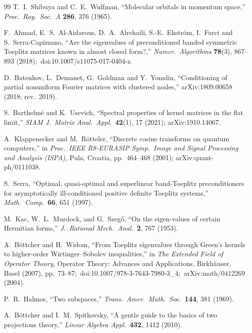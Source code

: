 \documentclass[aps,pra,twocolumn,superscriptaddress,longbibliography]{revtex4-2}
\begin{document}
\begin{thebibliography}{99}
T.~I.~Shibuya and C.~E.~Wulfman, ``Molecular orbitals in momentum space,''
\textit{Proc.\ Roy.\ Soc.\ A} \textbf{286}, 376 (1965).

F.~Ahmad, E.~S.~Al-Aidarous, D.~A.~Alrehaili, S.-E.~Ekstr\"om, I.~Furci and
S.~Serra-Capizzano, ``Are the eigenvalues of preconditioned banded symmetric
Toeplitz matrices known in almost closed form?,'' \textit{Numer.\ Algorithms}
\textbf{78}(3), 867--893 (2018);\ doi:10.1007/s11075-017-0404-z.

D.~Batenkov, L.~Demanet, G.~Goldman and Y.~Yomdin, ``Conditioning of partial
nonuniform Fourier matrices with clustered nodes,'' arXiv:1809.00658 (2018;
rev.\ 2019).

S.~Barthelm\'e and K.~Usevich, ``Spectral properties of kernel matrices in the
flat limit,'' \textit{SIAM J.\ Matrix Anal.\ Appl.}\ \textbf{42}(1), 17 (2021);
arXiv:1910.14067.

A.~Klappenecker and M.~R\"otteler, ``Discrete cosine transforms on quantum
computers,'' in \textit{Proc.\ IEEE R8-EURASIP Symp.\ Image and Signal
Processing and Analysis (ISPA)}, Pula, Croatia, pp.\ 464--468 (2001);
arXiv:quant-ph/0111038.

S.~Serra, ``Optimal, quasi-optimal and superlinear band-Toeplitz
preconditioners for asymptotically ill-conditioned positive definite Toeplitz
systems,'' \textit{Math.\ Comp.}\ \textbf{66}, 651 (1997).

M.~Kac, W.~L.~Murdock, and G.~Szeg\H{o}, ``On the eigen-values of certain
Hermitian forms,'' \textit{J.\ Rational Mech.\ Anal.}\ \textbf{2}, 767 (1953).

A.~B\"ottcher and H.~Widom, ``From Toeplitz eigenvalues through Green's
kernels to higher-order Wirtinger--Sobolev inequalities,'' in
\textit{The Extended Field of Operator Theory}, Operator Theory: Advances and
Applications, Birkh\"auser, Basel (2007), pp.~73--87;\
doi:10.1007/978-3-7643-7980-3\_4;\ arXiv:math/0412269 (2004).

P.~R.~Halmos, ``Two subspaces,''
\textit{Trans.\ Amer.\ Math.\ Soc.}\ \textbf{144}, 381 (1969).

A.~B\"ottcher and I.~M.~Spitkovsky, ``A gentle guide to the basics of two
projections theory,'' \textit{Linear Algebra Appl.}\ \textbf{432}, 1412
(2010).

\end{thebibliography}
\end{document}
